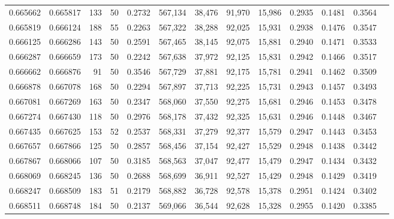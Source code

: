 \begin{tabular}{rrrrrrrrrrrrr}
0.665662 & 0.665817 &   133 &  50 &                                     0.2732 & 567,134 &  38,476 &  91,970 &  15,986 & 0.2935 & 0.1481 & 0.3564 \\
0.665819 & 0.666124 &   188 &  55 &                                     0.2263 & 567,322 &  38,288 &  92,025 &  15,931 & 0.2938 & 0.1476 & 0.3547 \\
0.666125 & 0.666286 &   143 &  50 &                                     0.2591 & 567,465 &  38,145 &  92,075 &  15,881 & 0.2940 & 0.1471 & 0.3533 \\
0.666287 & 0.666659 &   173 &  50 &                                     0.2242 & 567,638 &  37,972 &  92,125 &  15,831 & 0.2942 & 0.1466 & 0.3517 \\
0.666662 & 0.666876 &    91 &  50 &                                     0.3546 & 567,729 &  37,881 &  92,175 &  15,781 & 0.2941 & 0.1462 & 0.3509 \\
0.666878 & 0.667078 &   168 &  50 &                                     0.2294 & 567,897 &  37,713 &  92,225 &  15,731 & 0.2943 & 0.1457 & 0.3493 \\
0.667081 & 0.667269 &   163 &  50 &                                     0.2347 & 568,060 &  37,550 &  92,275 &  15,681 & 0.2946 & 0.1453 & 0.3478 \\
0.667274 & 0.667430 &   118 &  50 &                                     0.2976 & 568,178 &  37,432 &  92,325 &  15,631 & 0.2946 & 0.1448 & 0.3467 \\
0.667435 & 0.667625 &   153 &  52 &                                     0.2537 & 568,331 &  37,279 &  92,377 &  15,579 & 0.2947 & 0.1443 & 0.3453 \\
0.667657 & 0.667866 &   125 &  50 &                                     0.2857 & 568,456 &  37,154 &  92,427 &  15,529 & 0.2948 & 0.1438 & 0.3442 \\
0.667867 & 0.668066 &   107 &  50 &                                     0.3185 & 568,563 &  37,047 &  92,477 &  15,479 & 0.2947 & 0.1434 & 0.3432 \\
0.668069 & 0.668245 &   136 &  50 &                                     0.2688 & 568,699 &  36,911 &  92,527 &  15,429 & 0.2948 & 0.1429 & 0.3419 \\
0.668247 & 0.668509 &   183 &  51 &                                     0.2179 & 568,882 &  36,728 &  92,578 &  15,378 & 0.2951 & 0.1424 & 0.3402 \\
0.668511 & 0.668748 &   184 &  50 &                                     0.2137 & 569,066 &  36,544 &  92,628 &  15,328 & 0.2955 & 0.1420 & 0.3385 \\

\end{tabular}
